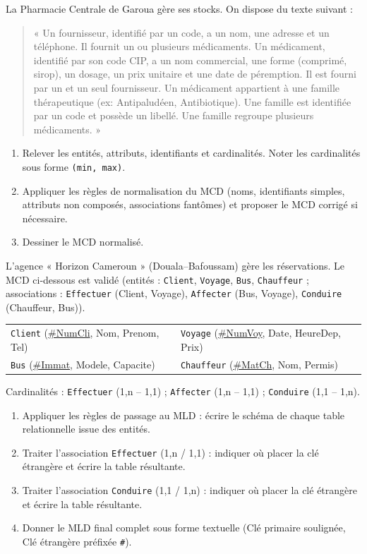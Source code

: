 \documentclass[11pt]{article}
\begin{document}
\begin{exercice}
La Pharmacie Centrale de Garoua gère ses stocks. On dispose du texte suivant :
\begin{quote}
« Un fournisseur, identifié par un code, a un nom, une adresse et un téléphone. Il fournit un ou plusieurs médicaments. Un médicament, identifié par son code CIP, a un nom commercial, une forme (comprimé, sirop), un dosage, un prix unitaire et une date de péremption. Il est fourni par un et un seul fournisseur. Un médicament appartient à une famille thérapeutique (ex: Antipaludéen, Antibiotique). Une famille est identifiée par un code et possède un libellé. Une famille regroupe plusieurs médicaments. »
\end{quote}
\begin{enumerate}
    \item Relever les entités, attributs, identifiants et cardinalités. Noter les cardinalités sous forme \texttt{(min, max)}.
    \item Appliquer les règles de normalisation du MCD (noms, identifiants simples, attributs non composés, associations fantômes) et proposer le MCD corrigé si nécessaire.
    \item Dessiner le MCD normalisé.
\end{enumerate}
\end{exercice}

\begin{exercice}
L'agence « Horizon Cameroun » (Douala--Bafoussam) gère les réservations. Le MCD ci-dessous est validé (entités : \texttt{Client}, \texttt{Voyage}, \texttt{Bus}, \texttt{Chauffeur} ; associations : \texttt{Effectuer} (Client, Voyage), \texttt{Affecter} (Bus, Voyage), \texttt{Conduire} (Chauffeur, Bus)).
\begin{center}
\begin{tabular}{ll}
\texttt{Client} (\underline{\#NumCli}, Nom, Prenom, Tel) & \texttt{Voyage} (\underline{\#NumVoy}, Date, HeureDep, Prix) \\
\texttt{Bus} (\underline{\#Immat}, Modele, Capacite) & \texttt{Chauffeur} (\underline{\#MatCh}, Nom, Permis)
\end{tabular}
\end{center}
Cardinalités : \texttt{Effectuer} (1,n -- 1,1) ; \texttt{Affecter} (1,n -- 1,1) ; \texttt{Conduire} (1,1 -- 1,n).
\begin{enumerate}
    \item Appliquer les règles de passage au MLD : écrire le schéma de chaque table relationnelle issue des entités.
    \item Traiter l'association \texttt{Effectuer} (1,n / 1,1) : indiquer où placer la clé étrangère et écrire la table résultante.
    \item Traiter l'association \texttt{Conduire} (1,1 / 1,n) : indiquer où placer la clé étrangère et écrire la table résultante.
    \item Donner le MLD final complet sous forme textuelle (Clé primaire soulignée, Clé étrangère préfixée \texttt{\#}).
\end{enumerate}
\end{exercice}
\end{document}
